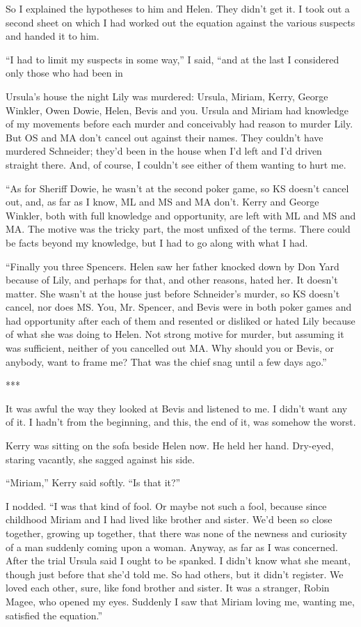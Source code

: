 {So I explained the hypotheses to him and Helen. They didn’t get it. I took out a second sheet on which I had worked out the equation against the various suspects and handed it to him.

“I had to limit my suspects in some way,” I said, “and at the last I considered only those who had been in

Ursula’s house the night Lily was murdered: Ursula, Miriam, Kerry, George Winkler, Owen Dowie, Helen, Bevis and you. Ursula and Miriam had knowledge of my movements before each murder and conceivably had reason to murder Lily. But OS and MA don’t cancel out against their names. They couldn’t have murdered Schneider; they’d been in the house when I’d left and I’d driven straight there. And, of course, I couldn’t see either of them wanting to hurt me.

“As for Sheriff Dowie, he wasn’t at the second poker game, so KS doesn’t cancel out, and, as far as I know, ML and MS and MA don’t. Kerry and George Winkler, both with full knowledge and opportunity, are left with ML and MS and MA. The motive was the tricky part, the most unfixed of the terms. There could be facts beyond my knowledge, but I had to go along with what I had.

“Finally you three Spencers. Helen saw her father knocked down by Don Yard because of Lily, and perhaps for that, and other reasons, hated her. It doesn’t matter. She wasn’t at the house just before Schneider’s murder, so KS doesn’t cancel, nor does MS. You, Mr. Spencer, and Bevis were in both poker games and had opportunity after each of them and resented or disliked or hated Lily because of what she was doing to Helen. Not strong motive for murder, but assuming it was sufficient, neither of you cancelled out MA. Why should you or Bevis, or anybody, want to frame me? That was the chief snag until a few days ago.”

***

It was awful the way they looked at Bevis and listened to me. I didn’t want any of it. I hadn’t from the beginning, and this, the end of it, was somehow the worst.

Kerry was sitting on the sofa beside Helen now. He held her hand. Dry-eyed, staring vacantly, she sagged against his side.

“Miriam,” Kerry said softly. “Is that it?”

I nodded. “I was that kind of fool. Or maybe not such a fool, because since childhood Miriam and I had lived like brother and sister. We’d been so close together, growing up together, that there was none of the newness and curiosity of a man suddenly coming upon a woman. Anyway, as far as I was concerned. After the trial Ursula said I ought to be spanked. I didn’t know what she meant, though just before that she’d told me. So had others, but it didn’t register. We loved each other, sure, like fond brother and sister. It was a stranger, Robin Magee, who opened my eyes. Suddenly I saw that Miriam loving me, wanting me, satisfied the equation.”

}

